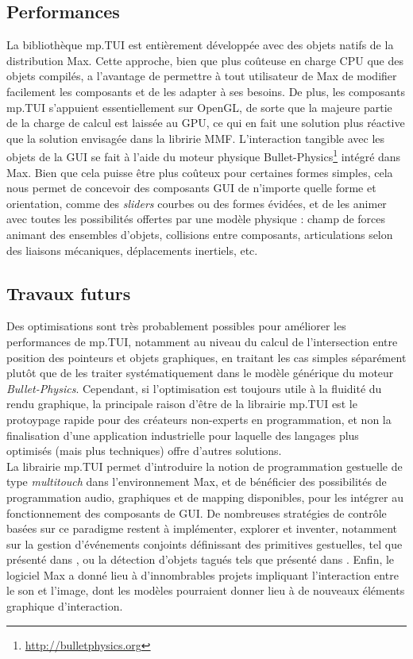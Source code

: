 \subsection{Performances}

\noindent La bibliothèque mp.TUI est entièrement développée avec des objets natifs de la distribution Max. Cette approche, bien que plus coûteuse en charge \gls{CPU} que des objets compilés, a l'avantage de permettre à tout utilisateur de Max de modifier facilement les composants et de les adapter à ses besoins. De plus, les composants mp.TUI s'appuient essentiellement sur OpenGL, de sorte que la majeure partie de la charge de calcul est laissée au \gls{GPU}, ce qui en fait une solution plus réactive que la solution envisagée dans la libririe MMF. L'interaction tangible avec les objets de la \gls{GUI} se fait à l'aide du moteur physique Bullet-Physics\footnote{\url{http://bulletphysics.org}} intégré dans Max. Bien que cela puisse être plus coûteux pour certaines formes simples, cela nous permet de concevoir des composants \gls{GUI} de n'importe quelle forme et orientation, comme des \textit{sliders} courbes ou des formes évidées, et de les animer avec toutes les possibilités offertes par une modèle physique : champ de forces animant des ensembles d'objets, collisions entre composants, articulations selon des liaisons mécaniques, déplacements inertiels, etc.

\subsection{Travaux futurs}

\noindent Des optimisations sont très probablement possibles pour améliorer les performances de mp.TUI, notamment au niveau du calcul de l'intersection entre position des pointeurs et objets graphiques, en traitant les cas simples séparément plutôt que de les traiter systématiquement dans le modèle générique du moteur \textit{Bullet-Physics}. Cependant, si l'optimisation est toujours utile à la fluidité du rendu graphique, la principale raison d'être de la librairie mp.TUI est le protoypage rapide pour des créateurs non-experts en programmation, et non la finalisation d'une application industrielle pour laquelle des langages plus optimisés (mais plus techniques) offre d'autres solutions.\\
\noindent La librairie mp.TUI permet d'introduire la notion de programmation gestuelle de type \textit{multitouch} dans l'environnement Max, et de bénéficier des possibilités de programmation audio, graphiques et de mapping disponibles, pour les intégrer au fonctionnement des composants de \gls{GUI}. De nombreuses stratégies de contrôle basées sur ce paradigme restent à implémenter, explorer et inventer, notamment sur la gestion d'événements conjoints définissant des primitives gestuelles, tel que présenté dans \cite{oney_implementing_2019}, ou la détection d'objets tagués tels que présenté dans \cite{yu_tuic_2011}. Enfin, le logiciel Max a donné lieu à d'innombrables projets impliquant l'interaction entre le son et l'image, dont les modèles pourraient donner lieu à de nouveaux éléments graphique d'interaction.


